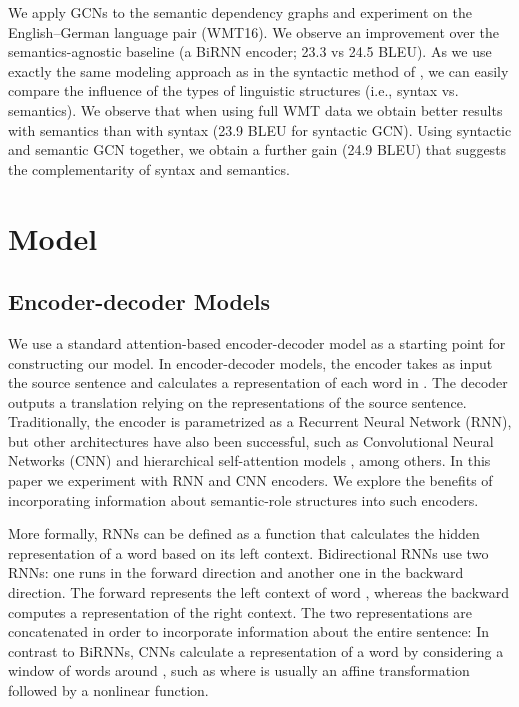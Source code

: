 \documentclass[11pt,a4paper]{article}
\begin{document}
We apply GCNs to the semantic dependency graphs and experiment on the  English--German language pair (WMT16). 
We observe an improvement over the semantics-agnostic baseline (a BiRNN encoder; 23.3 vs 24.5 BLEU). 
As we use exactly the same modeling approach as in the syntactic method of , we can easily compare the influence of the types of linguistic structures (i.e., syntax vs. semantics). 
We observe that when using full WMT data we obtain better results with semantics than with syntax (23.9 BLEU for syntactic GCN).
Using syntactic and semantic GCN together, we obtain a further gain (24.9 BLEU) that suggests the complementarity of syntax and semantics.

\section{Model}


\subsection{Encoder-decoder Models}

We use a standard attention-based encoder-decoder model \cite{bahdanau15iclr} as a starting point for constructing our model.
In encoder-decoder models, the encoder takes as input the source sentence  and calculates a representation of each word  in . 
The decoder outputs a translation   relying on the representations of the source sentence.
Traditionally, the encoder is parametrized as a Recurrent Neural Network (RNN), but other architectures have also been successful, such as Convolutional Neural Networks (CNN) \cite{gehring2016convolutional} and hierarchical self-attention models \cite{NIPS2017_7181}, among others.
In this paper we experiment with RNN and CNN encoders. 
We explore the benefits of incorporating information about semantic-role structures into such encoders.

More formally, RNNs \cite{elman1990finding} can be defined as a function  that calculates the hidden representation  of a word  based on its left context.
Bidirectional RNNs use two RNNs: one runs in the forward direction and another one in the backward direction.
The forward  represents the left context of word , whereas the backward  computes a representation of the right context. The two representations are concatenated in order to incorporate information about the entire sentence:  
In contrast to BiRNNs, CNNs \cite{lecun-01a} calculate a representation of a word  by considering a window of words  around , such as 
where  is usually an affine transformation followed by a nonlinear function.
\end{document}

